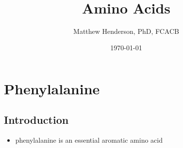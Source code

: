 \documentclass[12pt]{scrartcl}
\author{Matthew Henderson, PhD, FCACB}
\date{\today}
\title{Amino Acids}
\begin{document}
\maketitle
\setcounter{tocdepth}{2}
\tableofcontents



\section{Phenylalanine}
\label{sec:org3de896d}
\subsection{Introduction}
\label{sec:org25880af}
\begin{itemize}
\item phenylalanine is an essential aromatic amino acid
\end{itemize}

\begin{center}
\chemnameinit{}
\end{center}
\end{document}
